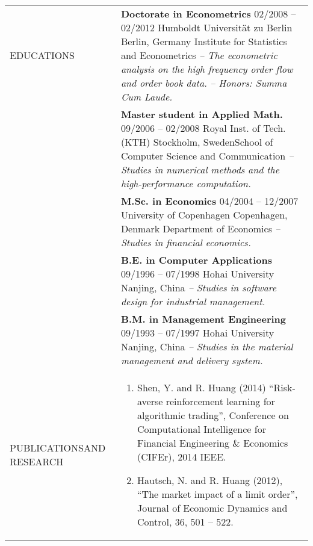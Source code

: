 \documentclass[a4paper,10pt]{article}
\begin{document}
\begin{longtable}[h]{p{}p{}}
EDUCATIONS
& \textbf{Doctorate in Econometrics} \hfill 02/2008 -- 02/2012 \newline Humboldt Universit\"at zu Berlin \hfill Berlin, Germany \newline Institute for Statistics and Econometrics\newline
    \emph{-- The econometric analysis on the high frequency order flow and order book data.}\newline 
    \emph{-- Honors: Summa Cum Laude.} \\
  & \textbf{Master student in Applied Math.} \hfill 09/2006 -- 02/2008 \newline Royal Inst. of Tech. (KTH) \hfill Stockholm, Sweden\newline School of Computer Science and Communication \newline
	\emph{-- Studies in numerical methods and the high-performance computation.} \\
  & \textbf{M.Sc. in Economics} \hfill 04/2004 -- 12/2007 \newline University of Copenhagen \hfill Copenhagen, Denmark  \newline Department of Economics \newline\emph{-- Studies in financial economics.}\\
  & \textbf{B.E. in Computer Applications} \hfill 09/1996 -- 07/1998 \newline Hohai University \hfill Nanjing, China \newline\emph{-- Studies in software design for industrial management.}\\
  & \textbf{B.M. in Management Engineering} \hfill 09/1993 -- 07/1997 \newline Hohai University \hfill Nanjing, China \newline\emph{-- Studies in the material management and delivery system.}\newline\\
PUBLICATIONS\newline AND \newline RESEARCH
  &\vspace{-20pt}
  \begin{enumerate}
    \item Shen, Y. and R. Huang (2014) ``Risk-averse reinforcement learning for algorithmic trading'', Conference on Computational Intelligence for Financial Engineering \& Economics (CIFEr), 2014 IEEE.
    \item Hautsch, N. and R. Huang (2012), ``The market impact of a limit order'', Journal of Economic Dynamics and Control, 36, 501 -- 522.

\end{enumerate}
\end{longtable}
\end{document}
